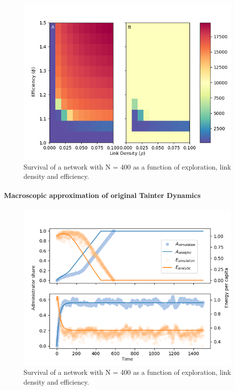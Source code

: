 \begin{figure}[htb]
    \centering
    \includegraphics[width = \linewidth]{../figures/parscan_base.png}
    \caption{Survival of a network with N = 400 as a function of exploration, link density and efficiency.}
    \label{fig:survival}
\end{figure}



\paragraph{Macroscopic approximation of original Tainter Dynamics}

\begin{figure}[htb]
    \centering
    \includegraphics[width = \linewidth]{../figures/comp_integration-model_exploration.png}
    \caption{Survival of a network with N = 400 as a function of exploration, link density and efficiency.}
    \label{fig:survival}
\end{figure}

